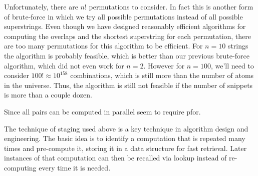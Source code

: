 \begin{gram}
Unfortunately, there are $n!$ permutations to consider.
%
In fact this is another form of brute-force in which we try all
possible permutations instead of all possible superstrings.
%
Even though we have designed reasonably efficient algorithms for
computing the overlaps and the shortest superstring for each
permutation, there are too many permutations for this algorithm to be
efficient.
%
For $n = 10$ strings the algorithm is probably feasible, which is
better than our previous brute-force algorithm, which did not even
work for $n = 2$.
%
However for $n = 100$, we'll need to consider
$100!  \approx 10^{158}$ combinations, which is still more than the
number of atoms in the universe. 
%
Thus, the algorithm is still not feasible if the number of snippets is
more than a couple dozen.
\end{gram}


\begin{teachnote}
Since all pairs can be computed in parallel seem to require pfor.
\end{teachnote}




%
\begin{remark}
The technique of staging used above is a key technique in algorithm
design and engineering.
%
The basic idea is to identify a computation that is repeated many
times and pre-compute it, storing it in a data structure for fast
retrieval.
%
Later instances of that computation can then be recalled via lookup
instead of re-computing every time it is needed. 
\end{remark}

